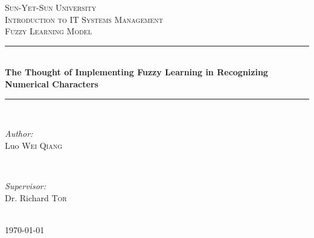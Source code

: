 \documentclass[12pt]{article} %
\begin{document}

\begin{titlepage}

\newcommand{\HRule}{\rule{\linewidth}{0.5mm}} %

\center %

\textsc{\LARGE Sun-Yet-Sun University}\\[1.5cm] %
\textsc{\Large Introduction to IT Systems Management}\\[0.5cm] %
\textsc{\large Fuzzy Learning Model}\\[0.5cm] %

\HRule \\[0.4cm]
{ \bfseries The Thought of Implementing Fuzzy Learning in Recognizing Numerical Characters}\\[0.4cm] %
\HRule \\[1.5cm]

\begin{minipage}{0.4\textwidth}
\begin{flushleft} \large
\emph{Author:}\\
Luo \textsc{Wei Qiang} %
\end{flushleft}
\end{minipage}
~
\begin{minipage}{0.4\textwidth}
\begin{flushright} \large
\emph{Supervisor:} \\
Dr. Richard \textsc{Tor} %
\end{flushright}
\end{minipage}\\[4cm]

{\large \today}\\[3cm] %


\vfill %

\end{titlepage}
\end{document}
